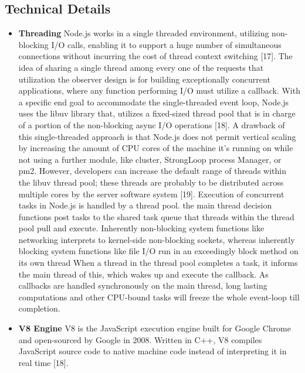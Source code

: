 \documentclass[../thesis.tex]{subfiles}
\begin{document}
\subsection*{Technical Details}
\begin{itemize}
    \item \textbf{Threading}
    \vspace{5mm}
    Node.js works in a single threaded environment, utilizing non-blocking I/O calls, enabling it to support a huge number of simultaneous connections without incurring the cost of thread context switching [17]. The idea of sharing a single thread among every one of the requests that utilization the observer design is for building exceptionally concurrent applications, where any function performing I/O must utilize a callback. With a specific end goal to accommodate the single-threaded event loop, Node.js uses the libuv library that, utilizes a fixed-sized thread pool that is in charge of a portion of the non-blocking async I/O operations [18].
    \vspace{5mm}
    A drawback of this single-threaded approach is that Node.js does not permit vertical scaling by increasing the amount of CPU cores of the machine it's running on while not using a further module, like cluster, StrongLoop process Manager, or pm2. However, developers can increase the default range of threads within the libuv thread pool; these threads are probably to be distributed across multiple cores by the server software system [19].
    \vspace{5mm}
    Execution of concurrent tasks in Node.js is handled by a thread pool. the main thread decision functions post tasks to the shared task queue that threads within the thread pool pull and execute. Inherently non-blocking system functions like networking interprets to kernel-side non-blocking sockets, whereas inherently blocking system functions like file I/O run in an exceedingly block method on its own thread When a thread in the thread pool completes a task, it informs the main thread of this, which wakes up and execute the callback. As callbacks are handled synchronously on the main thread, long lasting computations and other CPU-bound tasks will freeze the whole event-loop till completion.
    \vspace{5mm}
    \item \textbf{V8 Engine}
    \vspace{5mm}
    V8 is the JavaScript execution engine built for Google Chrome and open-sourced by Google in 2008. Written in C++, V8 compiles JavaScript source code to native machine code instead of interpreting it in real time [18].

\end{itemize}
\end{document}
